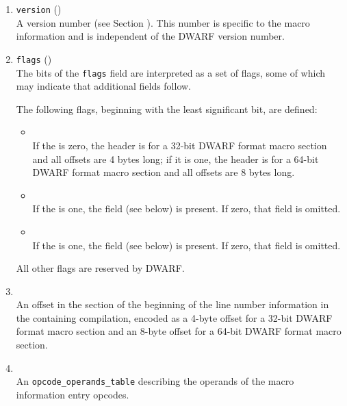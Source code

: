 \begin{enumerate}[1. ]
\item \texttt{version} (\HFTuhalf) \\
A version number (see Section ).
This number is specific to the macro information and is independent
of the DWARF version number.

\item \texttt{flags} (\HFTubyte) \\
The bits of the \texttt{flags} field are interpreted as a set
of flags, some of which may indicate that additional fields follow.

The following flags, beginning with the least significant bit, are defined:
\begin{itemize}
\item \HFNoffsetsizeflag \\
If the \HFNoffsetsizeflag{} is zero, the header is for a 32-bit 
DWARF format macro section and all offsets are 4 bytes long;
if it is one, the header is for a 64-bit DWARF format macro section 
and all offsets are 8 bytes long.

\item {} \\
If the  is one, 
the  field (see below) is present. 
If zero, that field is omitted.

\item {} \\
If the  is one,
the  field (see below) is present.
If zero, that field is omitted.

\end{itemize}
All other flags are reserved by DWARF.

\item {} \\
An offset in the \dotdebugline{} section of the
beginning of the line number information in the containing
compilation, encoded as a 4-byte offset for a 32-bit DWARF 
format macro section and an 8-byte offset for a 64-bit DWARF format
macro section.  

\item {} \\
An \texttt{opcode\_operands\_table} describing the operands 
of the macro information entry opcodes.


\end{enumerate}
